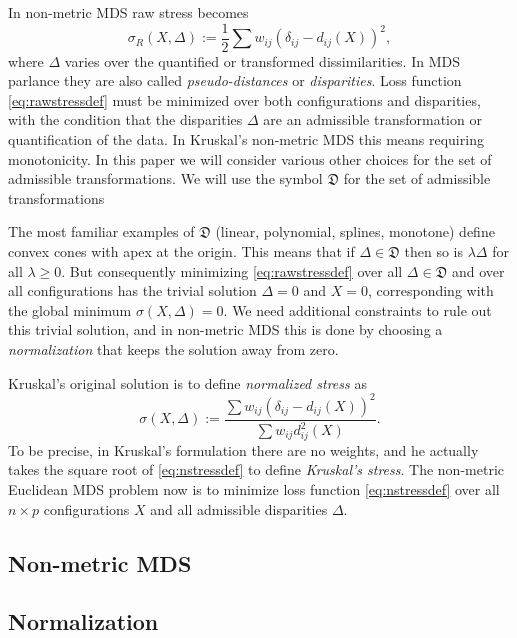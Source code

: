 \documentclass[
  12pt,
]{article}
\begin{document}
In non-metric MDS raw stress becomes
\begin{equation}
\sigma_R(X,\Delta):=\frac12\sum w_{ij}(\delta_{ij}-d_{ij}(X))^2,
\label{eq:rawstressdef}
\end{equation}
where \(\Delta\) varies over the quantified or transformed
dissimilarities. In MDS parlance they are also called \emph{pseudo-distances}
or \emph{disparities}. Loss function \eqref{eq:rawstressdef} must be minimized
over both configurations and disparities, with the condition that the
disparities \(\Delta\) are an admissible transformation or quantification
of the data. In Kruskal's non-metric MDS this means
requiring monotonicity. In this paper we will consider various other
choices for the set of admissible transformations. We will use the
symbol \(\mathfrak{D}\) for the set of admissible transformations

The most familiar examples of \(\mathfrak{D}\) (linear,
polynomial, splines, monotone) define convex cones with apex at the origin. This
means that if \(\Delta\in\mathfrak{D}\) then so is \(\lambda\Delta\) for all
\(\lambda\geq 0\). But consequently minimizing \eqref{eq:rawstressdef} over
all \(\Delta\in\mathfrak{D}\) and over all configurations has the trivial
solution \(\Delta=0\) and \(X=0\), corresponding with the global minimum
\(\sigma(X,\Delta)=0\). We need additional constraints to rule out this
trivial solution, and in non-metric MDS this is done by choosing a
\emph{normalization} that keeps the solution away from zero.

Kruskal's original solution is to define \emph{normalized stress} as
\begin{equation}
\sigma(X,\Delta):=\frac{\sum w_{ij}(\delta_{ij}-d_{ij}(X))^2}{\sum w_{ij}d_{ij}^2(X)}.
\label{eq:nstressdef}
\end{equation}
To be precise, in Kruskal's formulation there are no weights,
and he actually takes the square root of \eqref{eq:nstressdef} to define
\emph{Kruskal's stress}. The non-metric Euclidean MDS problem now is to minimize
loss function \eqref{eq:nstressdef} over all \(n\times p\) configurations
\(X\) and all admissible disparities \(\Delta\).

\subsection{Non-metric MDS}\label{non-metric-mds}

\subsection{Normalization}\label{normalization}
\end{document}
